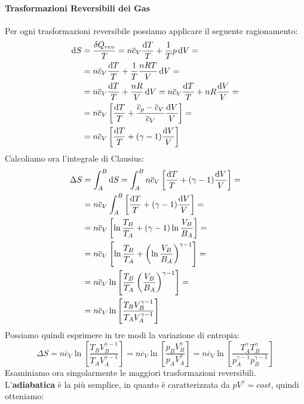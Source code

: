 \documentclass{article}
\begin{document}
\paragraph{Trasformazioni Reversibili dei Gas}
Per ogni trasformazioni reversibile possiamo applicare il seguente ragionamento:
\begin{equation}
\begin{split}
    \dif S&=\frac{\delta Q_{rev}}{T}=n\overline{c}_V\frac{\dif T}{T}+\frac{1}{T}p\dif V=\\
    &=n\overline{c}_V\frac{\dif T}{T}+\frac{1}{T}\frac{nRT}{V}\dif V=\\
    &=n\overline{c}_V\frac{\dif T}{T}+\frac{nR}{V}\dif V=n\overline{c}_V\frac{\dif T}{T}+nR\frac{\dif V}{V}=\\
    &=n\overline{c}_V\left[\frac{\dif T}{T}+\frac{\overline{c}_p-\overline{c}_V}{\overline{c}_V}\frac{\dif V}{V}\right]=\\
    &=n\overline{c}_V\left[\frac{\dif T}{T}+(\gamma-1)\frac{\dif V}{V}\right]
\end{split}
\end{equation}
Calcoliamo ora l'integrale di Clausius:
\begin{equation}
\begin{split}
    \Delta S&=\int_A^B\dif S=\int_A^Bn\overline{c}_V\left[\frac{\dif T}{T}+(\gamma-1)\frac{\dif V}{V}\right]=\\
    &=n\overline{c}_V\int_A^B\left[\frac{\dif T}{T}+(\gamma-1)\frac{\dif V}{V}\right]=\\
    &=n\overline{c}_V\left[\ln\frac{T_B}{T_A}+(\gamma-1)\ln\frac{V_B}{B_A}\right]=\\
    &=n\overline{c}_V\left[\ln\frac{T_B}{T_A}+\left(\ln\frac{V_B}{B_A}\right)^{\gamma-1}\right]=\\
    &=n\overline{c}_V\ln\left[\frac{T_B}{T_A}\left(\frac{V_B}{B_A}\right)^{\gamma-1}\right]=\\
    &=n\overline{c}_V\ln\left[\frac{T_BV_B^{\gamma-1}}{T_AV_A^{\gamma-1}}\right]
\end{split}
\end{equation}
Possiamo quindi esprimere in tre modi la variazione di entropia:
\[\Delta S=n\overline{c}_V\ln\left[\frac{T_BV_B^{\gamma-1}}{T_AV_A^{\gamma-1}}\right]=n\overline{c}_V\ln\left[\frac{p_BV_B^{\gamma}}{p_AV_A^{\gamma}}\right]=n\overline{c}_V\ln\left[\frac{T_A^{\gamma}T_B^{\gamma}}{p_A^{\gamma-1}p_B^{\gamma-1}}\right]\]
Esaminiamo ora singolarmente le maggiori trasformazioni reversibili.\\
L'\textbf{adiabatica} è la più semplice, in quanto è caratterizzata da $pV^{\gamma}=cost$, quindi otteniamo:
\end{document}
